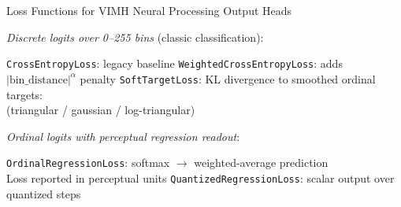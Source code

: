 \begin{slide}[\slideopts,toc={Losses}]{Loss Functions for VIMH Neural Processing Output Heads}
  \vspace{-0.75em}
  \begin{itemize}
    \mpitem \emph{Discrete logits over 0--255 bins} (classic classification):
    \begin{itemize}
      \mpitem \texttt{CrossEntropyLoss}: legacy baseline
      \mpitem \texttt{WeightedCrossEntropyLoss}: adds $|\text{bin\_distance}|^\alpha$ penalty
      \mpitem \texttt{SoftTargetLoss}: KL divergence to smoothed ordinal targets:\\
                      (triangular / gaussian / log-triangular)
    \end{itemize}
    \mpitem \emph{Ordinal logits with perceptual regression readout}:
    \begin{itemize}
      \mpitem \texttt{OrdinalRegressionLoss}: softmax $\rightarrow$ weighted-average prediction\\
      Loss reported in perceptual units
      \mpitem \texttt{QuantizedRegressionLoss}: scalar output over quantized steps \\

\end{itemize}
\end{itemize}
\end{slide}
